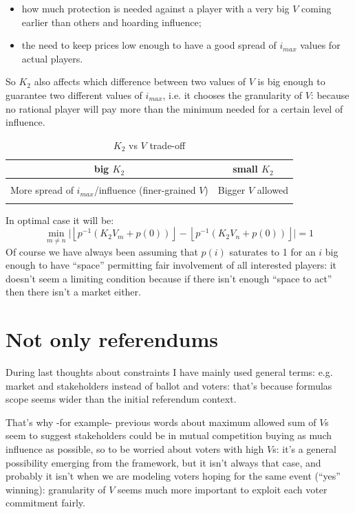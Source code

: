 \documentclass[10pt,a4paper]{article}
\begin{document}
	\begin{itemize}
		\item how much protection is needed against a player with a very big $V$ coming earlier than others and hoarding influence;
		\item the need to keep prices low enough to have a good spread of $i_{max}$ values for actual players.
	\end{itemize}
	So $K_{2}$ also affects which difference between two values of $V$ is big enough to guarantee two different values of $i_{max}$, i.e. it chooses the granularity of $V$: because no rational player will pay more than the minimum needed for a certain level of influence.
	\begin{table}[H]
		\begin{center}
			\begin{tabular}{c|c}
				\toprule
				big $K_{2}$ & small $K_{2}$ \\
				\midrule
				& \\
				More spread of $i_{max}$/influence (finer-grained $V$) & Bigger $V$ allowed \\
				& \\
				\bottomrule 
			\end{tabular}
			\caption{$K_{2}$ vs $V$ trade-off}
			\label{tab:tradeoff}
		\end{center}
	\end{table}
	In optimal case it will be:
	\begin{equation*}
		\min_{m \neq n}\Big| \left\lfloor p^{-1}(K_{2}V_{m}+p(0)) \right\rfloor - \left\lfloor p^{-1}(K_{2}V_{n}+p(0)) \right\rfloor \Big| = 1
	\end{equation*}
	Of course we have always been assuming that $p(i)$ saturates to 1 for an $i$ big enough to have \enquote{space} permitting fair involvement of all interested players: it doesn’t seem a limiting condition because if there isn’t enough \enquote{space to act} then there isn’t a market either.
	
	\section{Not only referendums}
	During last thoughts about constraints I have mainly used general terms: e.g. market and stakeholders instead of ballot and voters: that’s because formulas scope seems wider than the initial referendum context.
	
	That’s why -for example- previous words about maximum allowed sum of $V$s seem to suggest stakeholders could be in mutual competition buying as much influence as possible, so to be worried about voters with high $V$s: it’s a general possibility emerging from the framework, but it isn’t always that case, and probably it isn’t when we are modeling voters hoping for the same event (\enquote{yes} winning): granularity of $V$ seems much more important to exploit each voter commitment fairly.
	
\end{document}
